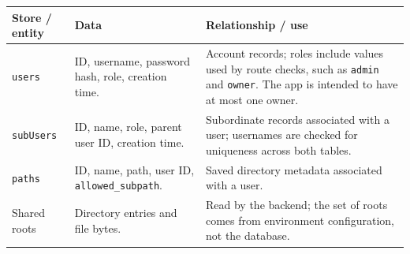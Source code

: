 \documentclass[10pt]{article}
\begin{document}
\begin{tabularx}{\linewidth}{>{\raggedright\arraybackslash}p{3.8cm}
                              >{\raggedright\arraybackslash}X
                              >{\raggedright\arraybackslash}X}
\textbf{Store / entity} & \textbf{Data} & \textbf{Relationship / use} \\
\hline
\texttt{users} & ID, username, password hash, role, creation time. &
Account records; roles include values used by route checks, such as \texttt{admin} and \texttt{owner}. The app is intended to have at most one owner. \\
\texttt{subUsers} & ID, name, role, parent user ID, creation time. &
Subordinate records associated with a user; usernames are checked for uniqueness across both tables. \\
\texttt{paths} & ID, name, path, user ID, \texttt{allowed\_subpath}. &
Saved directory metadata associated with a user. \\
Shared roots & Directory entries and file bytes. &
Read by the backend; the set of roots comes from environment configuration, not the database. \\
\end{tabularx}
\end{document}
